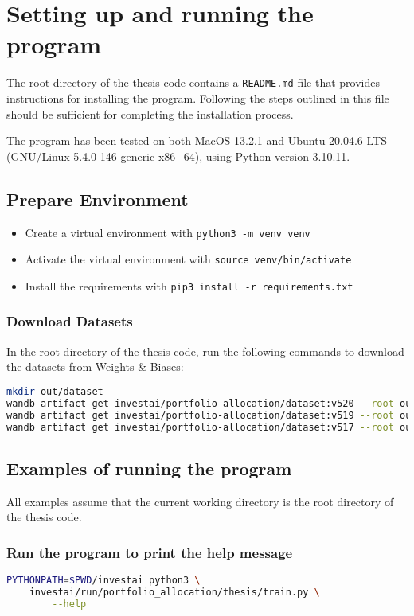 \documentclass[../xlapes02]{subfiles}
\begin{document}
    \chapter{Setting up and running the program}
    The root directory of the thesis code contains a \texttt{README.md} file that provides instructions for installing the program. Following the steps outlined in this file should be sufficient for completing the installation process.

    The program has been tested on both MacOS 13.2.1 and Ubuntu 20.04.6 LTS (GNU/Linux 5.4.0-146-generic x86\_64), using Python version 3.10.11.


    \section{Prepare Environment}
    \begin{itemize}
        \item Create a virtual environment with \texttt{python3 -m venv venv}
        \item Activate the virtual environment with \texttt{source venv/bin/activate}
        \item Install the requirements with \texttt{pip3 install -r requirements.txt}
    \end{itemize}

    \subsection{Download Datasets}
    In the root directory of the thesis code, run the following commands to download the datasets from Weights \& Biases:
    \begin{lstlisting}[language=bash]
mkdir out/dataset
wandb artifact get investai/portfolio-allocation/dataset:v520 --root out/dataset
wandb artifact get investai/portfolio-allocation/dataset:v519 --root out/dataset
wandb artifact get investai/portfolio-allocation/dataset:v517 --root out/dataset
    \end{lstlisting}


    \section{Examples of running the program}
    All examples assume that the current working directory is the root directory of the thesis code.

    \subsection{Run the program to print the help message}
    \begin{lstlisting}[language=bash]
PYTHONPATH=$PWD/investai python3 \
    investai/run/portfolio_allocation/thesis/train.py \
        --help
    \end{lstlisting}
\end{document}
